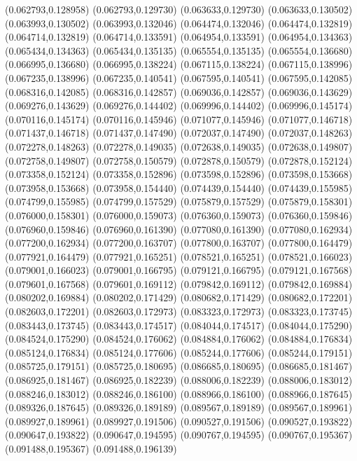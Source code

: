 (0.062793,0.128958)
(0.062793,0.129730)
(0.063633,0.129730)
(0.063633,0.130502)
(0.063993,0.130502)
(0.063993,0.132046)
(0.064474,0.132046)
(0.064474,0.132819)
(0.064714,0.132819)
(0.064714,0.133591)
(0.064954,0.133591)
(0.064954,0.134363)
(0.065434,0.134363)
(0.065434,0.135135)
(0.065554,0.135135)
(0.065554,0.136680)
(0.066995,0.136680)
(0.066995,0.138224)
(0.067115,0.138224)
(0.067115,0.138996)
(0.067235,0.138996)
(0.067235,0.140541)
(0.067595,0.140541)
(0.067595,0.142085)
(0.068316,0.142085)
(0.068316,0.142857)
(0.069036,0.142857)
(0.069036,0.143629)
(0.069276,0.143629)
(0.069276,0.144402)
(0.069996,0.144402)
(0.069996,0.145174)
(0.070116,0.145174)
(0.070116,0.145946)
(0.071077,0.145946)
(0.071077,0.146718)
(0.071437,0.146718)
(0.071437,0.147490)
(0.072037,0.147490)
(0.072037,0.148263)
(0.072278,0.148263)
(0.072278,0.149035)
(0.072638,0.149035)
(0.072638,0.149807)
(0.072758,0.149807)
(0.072758,0.150579)
(0.072878,0.150579)
(0.072878,0.152124)
(0.073358,0.152124)
(0.073358,0.152896)
(0.073598,0.152896)
(0.073598,0.153668)
(0.073958,0.153668)
(0.073958,0.154440)
(0.074439,0.154440)
(0.074439,0.155985)
(0.074799,0.155985)
(0.074799,0.157529)
(0.075879,0.157529)
(0.075879,0.158301)
(0.076000,0.158301)
(0.076000,0.159073)
(0.076360,0.159073)
(0.076360,0.159846)
(0.076960,0.159846)
(0.076960,0.161390)
(0.077080,0.161390)
(0.077080,0.162934)
(0.077200,0.162934)
(0.077200,0.163707)
(0.077800,0.163707)
(0.077800,0.164479)
(0.077921,0.164479)
(0.077921,0.165251)
(0.078521,0.165251)
(0.078521,0.166023)
(0.079001,0.166023)
(0.079001,0.166795)
(0.079121,0.166795)
(0.079121,0.167568)
(0.079601,0.167568)
(0.079601,0.169112)
(0.079842,0.169112)
(0.079842,0.169884)
(0.080202,0.169884)
(0.080202,0.171429)
(0.080682,0.171429)
(0.080682,0.172201)
(0.082603,0.172201)
(0.082603,0.172973)
(0.083323,0.172973)
(0.083323,0.173745)
(0.083443,0.173745)
(0.083443,0.174517)
(0.084044,0.174517)
(0.084044,0.175290)
(0.084524,0.175290)
(0.084524,0.176062)
(0.084884,0.176062)
(0.084884,0.176834)
(0.085124,0.176834)
(0.085124,0.177606)
(0.085244,0.177606)
(0.085244,0.179151)
(0.085725,0.179151)
(0.085725,0.180695)
(0.086685,0.180695)
(0.086685,0.181467)
(0.086925,0.181467)
(0.086925,0.182239)
(0.088006,0.182239)
(0.088006,0.183012)
(0.088246,0.183012)
(0.088246,0.186100)
(0.088966,0.186100)
(0.088966,0.187645)
(0.089326,0.187645)
(0.089326,0.189189)
(0.089567,0.189189)
(0.089567,0.189961)
(0.089927,0.189961)
(0.089927,0.191506)
(0.090527,0.191506)
(0.090527,0.193822)
(0.090647,0.193822)
(0.090647,0.194595)
(0.090767,0.194595)
(0.090767,0.195367)
(0.091488,0.195367)
(0.091488,0.196139)
